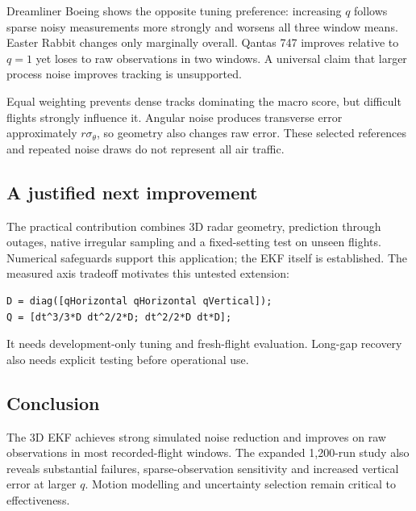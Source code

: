 \documentclass[12pt,a4paper]{article}
\begin{document}
Dreamliner Boeing shows the opposite tuning preference: increasing $q$ follows sparse noisy measurements more strongly and worsens all three window means. Easter Rabbit changes only marginally overall. Qantas 747 improves relative to $q=1$ yet loses to raw observations in two windows. A universal claim that larger process noise improves tracking is unsupported.

Equal weighting prevents dense tracks dominating the macro score, but difficult flights strongly influence it. Angular noise produces transverse error approximately $r\sigma_\theta$, so geometry also changes raw error. These selected references and repeated noise draws do not represent all air traffic.

\subsection{A justified next improvement}
The practical contribution combines 3D radar geometry, prediction through outages, native irregular sampling and a fixed-setting test on unseen flights. Numerical safeguards support this application; the EKF itself is established. The measured axis tradeoff motivates this untested extension:
\begin{lstlisting}
D = diag([qHorizontal qHorizontal qVertical]);
Q = [dt^3/3*D dt^2/2*D; dt^2/2*D dt*D];
\end{lstlisting}
It needs development-only tuning and fresh-flight evaluation. Long-gap recovery also needs explicit testing before operational use.

\subsection{Conclusion}
The 3D EKF achieves strong simulated noise reduction and improves on raw observations in most recorded-flight windows. The expanded 1,200-run study also reveals substantial failures, sparse-observation sensitivity and increased vertical error at larger $q$. Motion modelling and uncertainty selection remain critical to effectiveness.
\end{document}
